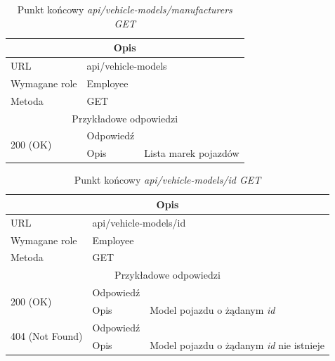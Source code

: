 \documentclass[eng,printmode,openany]{mgr}
\begin{document}
	\begin{table}[H]
		\caption{Punkt końcowy \textit{api/vehicle-models/manufacturers GET}}
		\begin{tabularx}{\textwidth}{|l|l|X|}
			\hline
			\multicolumn{3}{|c|}{Opis}                         						\\ \hline
			URL                       & \multicolumn{2}{l|}{api/vehicle-models} 	\\ \hline
			Wymagane role             & \multicolumn{2}{l|}{Employee} \\ \hline
			Metoda                    & \multicolumn{2}{l|}{GET} 					\\ \hline
			\multicolumn{3}{|c|}{ Przykładowe odpowiedzi}                   		\\ \hline
			\multirow{2}{*}{200 (OK)} 			& Odpowiedź     &      \\ \cline{2-3} 
			& Opis         	& Lista marek pojazdów       														\\ \hline
		\end{tabularx}
	\end{table}
	
	\begin{table}[H]
		\caption{Punkt końcowy \textit{api/vehicle-models/id GET}}
		\begin{tabularx}{\textwidth}{|l|l|X|}
			\hline
			\multicolumn{3}{|c|}{Opis}                         						\\ \hline
			URL                       & \multicolumn{2}{l|}{api/vehicle-models/id} 	\\ \hline
			Wymagane role             & \multicolumn{2}{l|}{Employee} \\ \hline
			Metoda                    & \multicolumn{2}{l|}{GET} 					\\ \hline
			\multicolumn{3}{|c|}{ Przykładowe odpowiedzi}                   		\\ \hline
			\multirow{2}{*}{200 (OK)} 			& Odpowiedź    	&         	\\ \cline{2-3} 
			& Opis         	& Model pojazdu o żądanym \textit{id}      										\\ \hline
			\multirow{2}{*}{404 (Not Found)} 	& Odpowiedź     &      \\ \cline{2-3} 
			& Opis          & Model pojazdu o żądanym \textit{id} nie istnieje      						\\ \hline
		\end{tabularx}
	\end{table}
	
\end{document}
